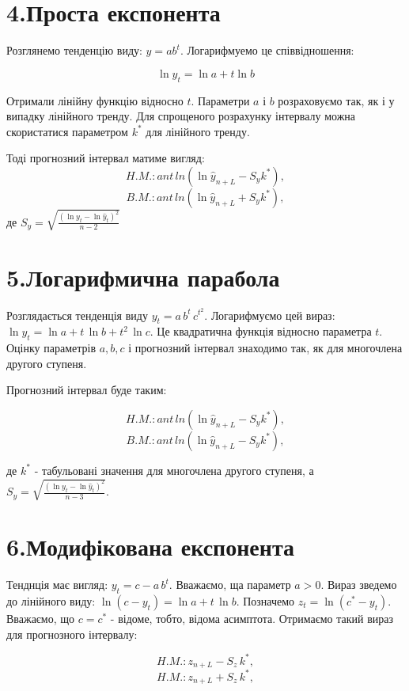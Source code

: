 \documentclass[a4paper, fontsize=10pt, oneside]{article}
\begin{document}
\chapter{\Large \bf 4.Проста експонента} 

Розглянемо тенденцію виду: $y = ab^t$. Логарифмуемо це співвідношення:

$$ \ln{y_{t}} = \ln{a} + t\ln{b}$$

Отримали лінійну функцію відносно $t$. Параметри $a$ і $b$ розраховуємо так, як і у випадку лінійного тренду. Для спрощеного розрахунку інтервалу можна скористатися параметром $k^{*}$ для лінійного тренду.

Тоді прогнозний інтервал матиме вигляд:
$$H.M.:ant \, ln{(\ln{\hat{y}_{n+L}-S_{y}k^{*}})},$$
$$B.M.:ant \, ln{(\ln{\hat{y}_{n+L}+S_{y}k^{*}})},$$
\noindent де $S_{y} = \sqrt{\frac{(\ln{y_{t}} - \ln{\hat{y}_{t}})^2}{n-2}}$

\chapter{\Large \bf 5.Логарифмична парабола}

Розглядається тенденція виду $y_{t} = a\,b^{t}\,c^{t^2}$. Логарифмуємо цей вираз: $\ln{y_{t}} = \ln{a} + t\,\ln{b} + t^2\,\ln{c}$. Це квадратична функція відносно параметра $t$. Оцінку параметрів $a, b, c$ і прогнозний інтервал знаходимо так, як для многочлена другого ступеня.

Прогнозний інтервал буде таким:

$$H.M.:ant \, ln{(\ln{\hat{y}_{n+L}-S_{y}k^{*}})},$$
$$B.M.:ant \, ln{(\ln{\hat{y}_{n+L}-S_{y}k^{*}})},$$

\noindent де $k^{*}$ - табульовані значення для многочлена другого ступеня, а $S_{y} = \sqrt{\frac{(\ln{y_{t}} - \ln{\hat{y}_{t}})^2}{n-3}}.$

\chapter{\Large \bf 6.Модифікована експонента}

Тенднція має вигляд: $y_{t} = c - a\,b^{t}.$ Вважаємо, ща параметр $a>0.$ Вираз зведемо до лінійного виду: $\ln{(c - y_{t})} = \ln{ a} + t\,\ln{b}.$ Позначемо $z_{t} = \ln{(c^{*} - y_{t})}.$ Вважаємо, що $c = c^{*}$ - відоме, тобто, відома асимптота. Отримаємо такий вираз для прогнозного інтервалу:

$$H.M.:z_{n+L} - S_{z}\,k^{*},$$
$$H.M.:z_{n+L} + S_{z}\,k^{*},$$
\end{document}
